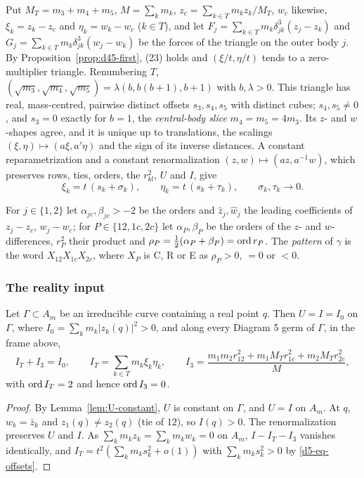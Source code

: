 Put $M_T=m_3+m_4+m_5$, $M=\sum_km_k$, $z_c=\sum_{k\in T}m_kz_k/M_T$, $w_c$ likewise,
$\xi_k=z_k-z_c$ and $\eta_k=w_k-w_c$ ($k\in T$), and let
$F_j=\sum_{k\in T}m_k\delta_{jk}^3(z_j-z_k)$ and $G_j=\sum_{k\in T}m_k\delta_{jk}^3(w_j-w_k)$ be the
forces of the triangle on the outer body $j$.  By Proposition~\ref{prop:d45-first}, (23) holds
and $(\xi/t,\eta/t)$ tends to a zero-multiplier triangle.  Renumbering $T$,
$(\sqrt{m_3},\sqrt{m_4},\sqrt{m_5})=\lambda(b,b(b+1),b+1)$ with $b,\lambda>0$.
This triangle has real, mass-centred, pairwise distinct offsets $s_3,s_4,s_5$ with distinct
cubes; $s_4,s_5\ne0$, and $s_3=0$ exactly for $b=1$, the \emph{central-body slice} $m_4=m_5=4m_3$.
Its $z$- and $w$-shapes agree, and it is unique up to translations, the scalings
$(\xi,\eta)\mapsto(a\xi,a'\eta)$ and the sign of its inverse distances.  A constant
reparametrization and a constant renormalization $(z,w)\mapsto(az,a^{-1}w)$, which preserves
rows, ties, orders, the $r_{kl}^2$, $U$ and $I$, give
\begin{equation}\label{d5-eq-offsets}
  \xi_k=t\,(s_k+\sigma_k),\qquad \eta_k=t\,(s_k+\tau_k),\qquad \sigma_k,\tau_k\to0.
\end{equation}

For $j\in\{1,2\}$ let $\alpha_{jc},\beta_{jc}>-2$ be the orders and $\hat z_j,\hat w_j$ the leading
coefficients of $z_j-z_c$, $w_j-w_c$; for $P\in\{12,1c,2c\}$ let $\alpha_P,\beta_P$ be the orders of
the $z$- and $w$-differences, $r_P^2$ their product and $\rho_P=\frac12(\alpha_P+\beta_P)=\operatorname{ord} r_P$.
The \emph{pattern} of $\gamma$ is the word $X_{12}X_{1c}X_{2c}$, where $X_P$ is C, R or E as
$\rho_P>0$, $=0$ or $<0$.

\subsubsection{The reality input}\label{d5-reality}
\begin{lemma}\label{d5-lem-reality}
Let $\Gamma\subset A_m$ be an irreducible curve containing a real point $q$.  Then $U=I=I_0$ on
$\Gamma$, where $I_0=\sum_km_k|z_k(q)|^2>0$, and along every Diagram 5 germ of $\Gamma$, in the
frame above,
\begin{equation}\label{d5-eq-inertia}
  I_T+I_3=I_0,\qquad I_T=\sum_{k\in T}m_k\xi_k\eta_k,\qquad
  I_3=\frac{m_1m_2r_{12}^2+m_1M_Tr_{1c}^2+m_2M_Tr_{2c}^2}{M},
\end{equation}
with $\operatorname{ord} I_T=2$ and hence $\operatorname{ord} I_3=0$.
\end{lemma}

\begin{proof}
By Lemma~\ref{lem:U-constant}, $U$ is constant on $\Gamma$, and $U=I$ on $A_m$.  At $q$,
$w_k=\bar z_k$ and $z_1(q)\ne z_2(q)$ (tie of $12$), so $I(q)>0$.  The renormalization preserves
$U$ and $I$.  As $\sum_km_kz_k=\sum_km_kw_k=0$ on $A_m$, $I-I_T-I_3$ vanishes identically, and
$I_T=t^2(\sum_km_ks_k^2+o(1))$ with $\sum_km_ks_k^2>0$ by \eqref{d5-eq-offsets}.
\end{proof}


